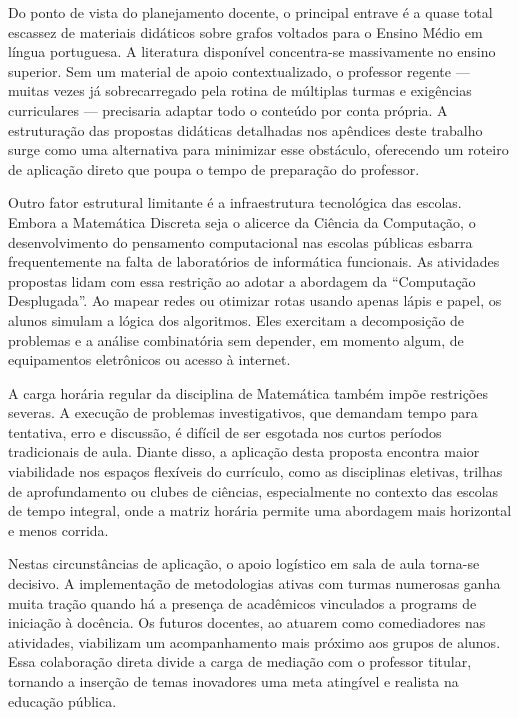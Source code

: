 \documentclass[
  12pt,
  oneside,
  a4paper,
  english,
  brazilian
  ]{abntex2}
\theoremstyle{definition}
\begin{document}
Do ponto de vista do planejamento docente, o principal entrave é a quase total escassez de materiais didáticos sobre grafos voltados para o Ensino Médio em língua portuguesa. A literatura disponível concentra-se massivamente no ensino superior. Sem um material de apoio contextualizado, o professor regente --- muitas vezes já sobrecarregado pela rotina de múltiplas turmas e exigências curriculares --- precisaria adaptar todo o conteúdo por conta própria. A estruturação das propostas didáticas detalhadas nos apêndices deste trabalho surge como uma alternativa para minimizar esse obstáculo, oferecendo um roteiro de aplicação direto que poupa o tempo de preparação do professor.

Outro fator estrutural limitante é a infraestrutura tecnológica das escolas. Embora a Matemática Discreta seja o alicerce da Ciência da Computação, o desenvolvimento do pensamento computacional nas escolas públicas esbarra frequentemente na falta de laboratórios de informática funcionais. As atividades propostas lidam com essa restrição ao adotar a abordagem da ``Computação Desplugada''. Ao mapear redes ou otimizar rotas usando apenas lápis e papel, os alunos simulam a lógica dos algoritmos. Eles exercitam a decomposição de problemas e a análise combinatória sem depender, em momento algum, de equipamentos eletrônicos ou acesso à internet.

A carga horária regular da disciplina de Matemática também impõe restrições severas. A execução de problemas investigativos, que demandam tempo para tentativa, erro e discussão, é difícil de ser esgotada nos curtos períodos tradicionais de aula. Diante disso, a aplicação desta proposta encontra maior viabilidade nos espaços flexíveis do currículo, como as disciplinas eletivas, trilhas de aprofundamento ou clubes de ciências, especialmente no contexto das escolas de tempo integral, onde a matriz horária permite uma abordagem mais horizontal e menos corrida.

Nestas circunstâncias de aplicação, o apoio logístico em sala de aula torna-se decisivo. A implementação de metodologias ativas com turmas numerosas ganha muita tração quando há a presença de acadêmicos vinculados a programs de iniciação à docência. Os futuros docentes, ao atuarem como comediadores nas atividades, viabilizam um acompanhamento mais próximo aos grupos de alunos. Essa colaboração direta divide a carga de mediação com o professor titular, tornando a inserção de temas inovadores uma meta atingível e realista na educação pública.
\end{document}
